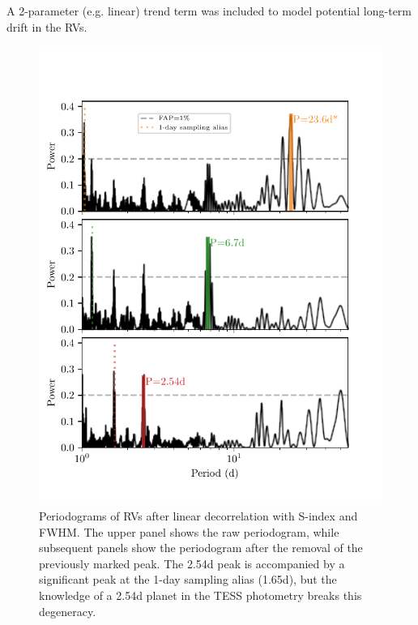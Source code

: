 \documentclass[fleqn,usenatbib]{mnras}
\newcommand{\TSindexperiod}{ $ 39.0 \pm 11.0 $ }
\begin{document}
A 2-parameter (e.g. linear) trend term was included to model potential long-term drift in the RVs.

\begin{figure}
	\includegraphics[width=\columnwidth, trim={0.3cm 1.1cm 0.8cm 1.3cm}]{TOI755_decorrelation_periodograms}
    \caption{Periodograms of RVs after linear decorrelation with S-index and FWHM. The upper panel shows the raw periodogram, while subsequent panels show the periodogram after the removal of the previously marked peak. The 2.54d peak is accompanied by a significant peak at the 1-day sampling alias (1.65d), but the knowledge of a 2.54d planet in the TESS photometry breaks this degeneracy.}
    \label{fig:rv_decorr}
\end{figure}
\end{document}

